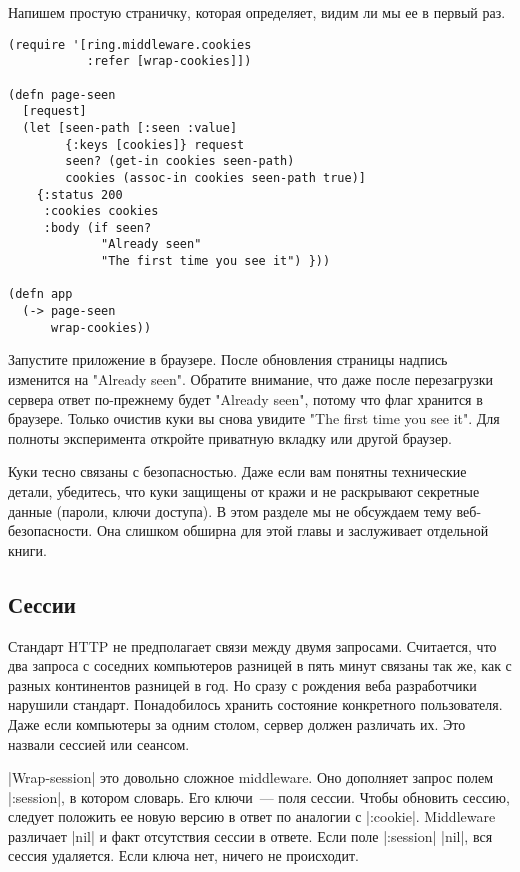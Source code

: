 Напишем простую страничку, которая определяет, видим ли мы ее в первый раз.

\begin{verbatim}
(require '[ring.middleware.cookies
           :refer [wrap-cookies]])

(defn page-seen
  [request]
  (let [seen-path [:seen :value]
        {:keys [cookies]} request
        seen? (get-in cookies seen-path)
        cookies (assoc-in cookies seen-path true)]
    {:status 200
     :cookies cookies
     :body (if seen?
             "Already seen"
             "The first time you see it") }))

(defn app
  (-> page-seen
      wrap-cookies))
\end{verbatim}

Запустите приложение в браузере. После обновления страницы надпись изменится на
"Already seen". Обратите внимание, что даже после перезагрузки сервера ответ
по-прежнему будет "Already seen", потому что флаг хранится в браузере. Только
очистив куки вы снова увидите "The first time you see it". Для полноты
эксперимента откройте приватную вкладку или другой браузер.

Куки тесно связаны с безопасностью. Даже если вам понятны технические детали,
убедитесь, что куки защищены от кражи и не раскрывают секретные данные (пароли,
ключи доступа). В этом разделе мы не обсуждаем тему веб-безопасности. Она
слишком обширна для этой главы и заслуживает отдельной книги.

\subsection{Сессии}

Стандарт HTTP не предполагает связи между двумя запросами. Считается, что два
запроса с соседних компьютеров разницей в пять минут связаны так же, как с
разных континентов разницей в год. Но сразу с рождения веба разработчики
нарушили стандарт. Понадобилось хранить состояние конкретного пользователя. Даже
если компьютеры за одним столом, сервер должен различать их. Это назвали сессией
или сеансом.

\spverb|Wrap-session| это довольно сложное middleware. Оно дополняет запрос полем
\spverb|:session|, в котором словарь. Его ключи~--- поля сессии. Чтобы обновить сессию,
следует положить ее новую версию в ответ по аналогии с \spverb|:cookie|. Middleware
различает \spverb|nil| и факт отсутствия сессии в ответе. Если поле \spverb|:session| \spverb|nil|, вся
сессия удаляется. Если ключа нет, ничего не происходит.


